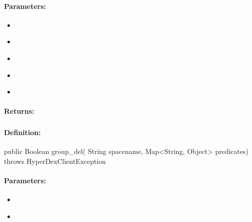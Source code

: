 \paragraph{Parameters:}
\begin{itemize}[noitemsep]
\item {}\\

\item {}\\

\item {}\\

\item {}\\

\item {}\\

\end{itemize}

\paragraph{Returns:}


\pagebreak
\subsubsection{}
\label{api:java:group_del}


\paragraph{Definition:}
\begin{javacode}
public Boolean group_del(
        String spacename,
        Map<String, Object> predicates) throws HyperDexClientException
\end{javacode}

\paragraph{Parameters:}
\begin{itemize}[noitemsep]
\item {}\\

\item {}\\

\end{itemize}

